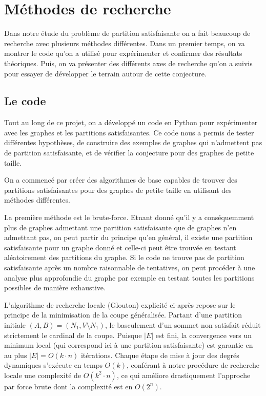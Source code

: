 \section{Méthodes de recherche}\label{sec:methods}

Dans notre étude du problème de partition satisfaisante on a fait beaucoup de recherche avec plusieurs méthodes différentes.
Dans un premier temps, on va montrer le code qu'on a utilisé pour expérimenter et confirmer des résultats théoriques.
Puis, on va présenter des différents axes de recherche qu'on a suivis pour essayer de développer le terrain autour de cette conjecture.

\subsection{Le code}

Tout au long de ce projet, on a développé un code en Python pour expérimenter avec les graphes et les partitions satisfaisantes.
Ce code nous a permis de tester différentes hypothèses, de construire des exemples de graphes qui n'admettent pas de partition satisfaisante, et de vérifier la conjecture pour des graphes de petite taille.

On a commencé par créer des algorithmes de base capables de trouver des partitions satisfaisantes pour des graphes de petite taille en utilisant des méthodes différentes.

La première méthode est le brute-force.
Etnant donné qu'il y a conséquemment plus de graphes admettant une partition satisfaisante que de graphes n'en admettant pas, on peut partir du principe qu'en général, il existe une partition satisfaisante pour un graphe donné et celle-ci peut être trouvée en testant aléatoirement des partitions du graphe.
Si le code ne trouve pas de partition satisfaisante après un nombre raisonnable de tentatives, on peut procéder à une analyse plus approfondie du graphe par exemple en testant toutes les partitions possibles de manière exhaustive.

L'algorithme de recherche locale (Glouton) explicité ci-après repose sur le principe de la minimisation de la coupe généralisée. 
Partant d'une partition initiale \((A,B)=(N_1,V \setminus N_1)\), le basculement d'un sommet non satisfait réduit strictement le cardinal de la coupe. 
Puisque \(|E|\) est fini, la convergence vers un minimum local (qui correspond ici à une partition satisfaisante) est garantie en au plus \(|E|=O(k\cdot n)\) itérations. 
Chaque étape de mise à jour des degrés dynamiques s'exécute en temps \(O(k)\), conférant à notre procédure de recherche locale une complexité de \(O(k^2 \cdot n)\), ce qui améliore drastiquement l'approche par force brute dont la complexité est en \(O(2^n)\).

